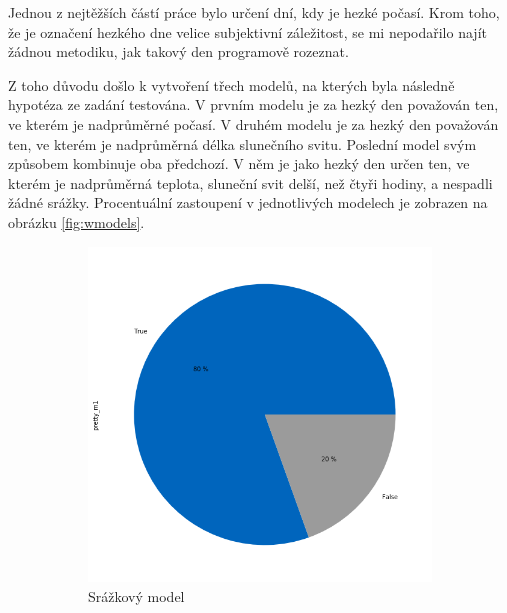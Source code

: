 \documentclass[12pt]{report}
\begin{document}
Jednou z nejtěžších částí práce bylo určení dní, kdy je hezké počasí. Krom toho, že je označení hezkého dne velice subjektivní záležitost, se mi nepodařilo najít žádnou metodiku, jak takový den programově rozeznat.

Z toho důvodu došlo k vytvoření třech modelů, na kterých byla následně hypotéza ze zadání testována. V prvním modelu je za hezký den považován ten, ve kterém je nadprůměrné počasí. V druhém modelu je za hezký den považován ten, ve kterém je nadprůměrná délka slunečního svitu. Poslední model svým způsobem kombinuje oba předchozí. V něm je jako hezký den určen ten, ve kterém je nadprůměrná teplota, sluneční svit delší, než čtyři hodiny, a nespadli žádné srážky. Procentuální zastoupení v jednotlivých modelech je zobrazen na obrázku \ref{fig:wmodels}.

\begin{figure}
    \begin{subfigure}{.33\textwidth}
        \centering
        \includegraphics[width=\linewidth]{m1_pie.png}
        \caption{Srážkový model}
        \label{fig:sfig1}
    \end{subfigure}%
    \begin{subfigure}{.33\textwidth}
        \centering

\end{subfigure}
\end{figure}
\end{document}
